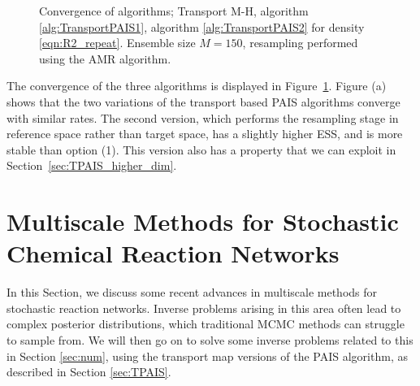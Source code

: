 \documentclass[final]{siamltex}
\begin{document}
\begin{figure}[!ht]
\centering
{}
\caption{Convergence of algorithms; Transport M-H,
  algorithm \ref{alg:TransportPAIS1}, algorithm \ref{alg:TransportPAIS2} for
  density \eqref{eqn:R2_repeat}. Ensemble size $M=150$, resampling performed using the AMR algorithm.}
\label{fig:R2_l2_convergence}
\end{figure}

The convergence of the three algorithms is displayed in Figure~\ref{fig:R2_l2_convergence}. Figure (a) shows that the two variations of the transport based PAIS algorithms converge with similar rates. The second version, which performs the resampling stage in reference space rather than target space, has a slightly higher ESS, and is more stable than option (1). This version also has a property that we can exploit in Section~\ref{sec:TPAIS_higher_dim}.



\section{Multiscale Methods for Stochastic Chemical Reaction
  Networks}\label{sec:multi}
In this Section, we discuss some recent advances in multiscale methods
for stochastic reaction networks. Inverse problems arising in this
area often lead to complex posterior
distributions, which traditional MCMC methods can struggle to sample
from. We will then go on to solve some inverse problems related to
this in Section \ref{sec:num}, using the transport map versions of the
PAIS algorithm, as described in Section \ref{sec:TPAIS}.
\end{document}
